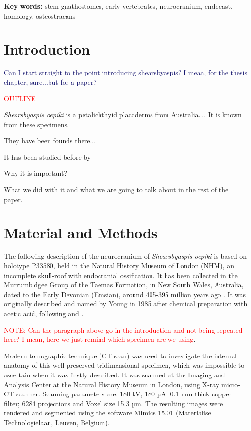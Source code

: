 \documentclass[12pt,letterpaper]{article}
\begin{document}
\noindent \textbf{Key words:} stem-gnathostomes, early vertebrates, neurocranium, endocast, homology, osteostracans

\newpage 

\section{Introduction}

\textcolor{MidnightBlue}{Can I start straight to the point introducing shearsbyaspis? I mean, for the thesis chapter, sure...but for a paper?}

\textcolor{Red}{OUTLINE}

\textit{Shearsbyaspis oepiki} is a petalichthyid placoderms from Australia.... It is known from these specimens.

They have been founds there...

It has been studied before by

Why it is important?

What we did with it and what we are going to talk about in the rest of the paper.

\section{Material and Methods}

The following description of the neurocranium of \textit{Shearsbyaspis oepiki} \citealt{Young1985} is based on holotype P33580, held in the Natural History Museum of London (NHM), an incomplete skull-roof with endocranial ossification. It has been collected in the Murrumbidgee Group of the Taemas Formation, in New South Wales, Australia, dated to the Early Devonian (Emsian), around 405-395 million years ago \citep{Young1978,Young1980,Young1985}. It  was originally described and named by Young in 1985 after chemical preparation with acetic acid, following \cite{Toombs1948} and \cite{Toombs1959}. 

\textcolor{Red}{NOTE: Can the paragraph above go in the introduction and not being repeated here? I mean, here we just remind which specimen are we using}.

Modern tomographic technique (CT scan) was used to investigate the internal anatomy of this well preserved tridimensional specimen, which was impossible to ascertain when it was firstly described. It was scanned at the Imaging and Analysis Center at the Natural History Museum in London, using X-ray micro-CT scanner. Scanning parameters are: 180 kV; 180 µA; 0.1 mm thick copper filter; 6284 projections and Voxel size 15.3 µm. The resulting images were rendered and segmented using the software Mimics 15.01 (Materialise Technologielaan, Leuven, Belgium).
\end{document}
